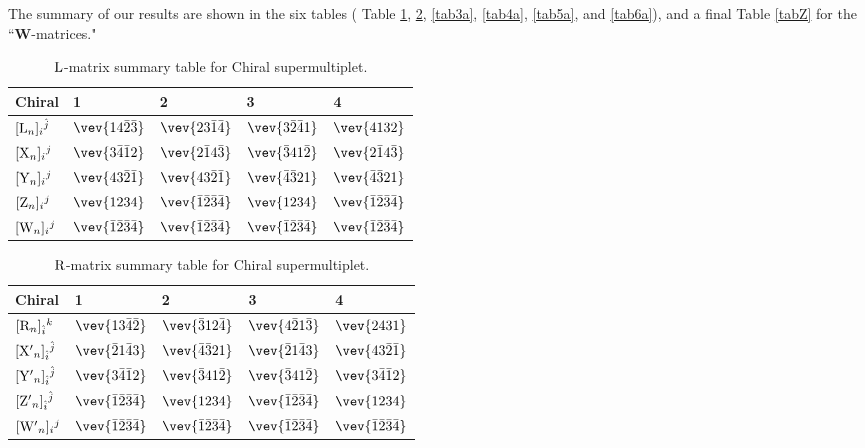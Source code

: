\documentclass[12pt]{article}
\def\rL{{\rm L}}
\def\rR{{\rm R}}
\let\bm\relax
\newcommand{\bm}[1]{{\boldsymbol{#1}}}
\begin{document}
The summary of our results are shown in the six tables ( Table \ref{tab1}, \ref{tab2}, \ref{tab3a}, \ref{tab4a}, \ref{tab5a}, and \ref{tab6a}), and a final Table \ref{tabZ} for the ``$\mathbf{W}$-matrices."

\begin{table}[H]
\setlength\extrarowheight{2pt}
\begin{center}
\begin{tabular}{|m{2.8em}|m{3.2cm}|m{3.2cm}|m{3.2cm}|m{3.2cm}|}
\hline
Chiral &  1&  2& 3& 4\\ 
\hline
$[{\bm \rL}_n]_{i}{}^{\hat j}$ & 
$\vev{14\bar2\bar3}$& 
$\vev{23\bar1\bar4}$& 
$\vev{3\bar2\bar41}$& 
$\vev{4132}$\\   
\hline
$[{\bm{\rm X}}_n]_{i}{}^{j}$ &  
$\vev{3\bar4\bar12}$&
$\vev{2\bar14\bar3}$&
$\vev{\bar341\bar2}$&
$\vev{2\bar14\bar3}$\\ 
\hline
$[{\bm{\rm Y}}_n]_{i}{}^{j}$ &  
$\vev{43\bar2\bar1}$&  
$\vev{43\bar2\bar1}$&   
$\vev{\bar4\bar321}$& 
$\vev{\bar4\bar321}$
\\ 
\hline
$[{\bm{\rm Z}}_n]_{i}{}^{j}$ &  
$\vev{1234}$&  
$\vev{\bar1\bar2\bar3\bar4}$&  
$\vev{1234}$&
$\vev{\bar1\bar2\bar3\bar4}$\\ 
\hline
$[{\bm{\rm W}}_n]_{i}{}^{j}$ &  
$\vev{\bar1\bar2\bar3\bar4}$&  
$\vev{\bar1\bar2\bar3\bar4}$&  
$\vev{\bar1\bar2\bar3\bar4}$&
$\vev{\bar1\bar2\bar3\bar4}$\\ 
\hline
\end{tabular}
\end{center}
\caption{$\bm\rL$-matrix summary table for Chiral supermultiplet.}
\label{tab1}
\end{table}

\begin{table}[H]\setlength\extrarowheight{2pt}
\begin{center}
\begin{tabular}{|m{2.8em}|m{3.2cm}|m{3.2cm}|m{3.2cm}|m{3.2cm}|}
\hline
Chiral &  1&  2& 3& 4\\ 
\hline
$[{\bm{\rm R}}_n]_{\hat i}{}^{k}$ & 
$\vev{13\bar4\bar2}$ 
&$\vev{\bar312\bar4}$
& $\vev{4\bar21\bar3}$
& $\vev{2431}$\\ 
\hline
$[{\bm{\rm X'}}_n]_{\hat i}{}^{\hat j}$ &  
$\vev{\bar21\bar43}$&
$\vev{\bar4\bar321}$&
$\vev{\bar21\bar43}$& 
$\vev{43\bar2\bar1}$\\ 
\hline
$[{\bm{\rm Y'}}_n]_{\hat i}{}^{\hat j}$ &  
$\vev{3\bar4\bar12}$& 
$\vev{\bar341\bar2}$&  
$\vev{\bar341\bar2}$&
$\vev{3\bar4\bar12}$
\\ 
\hline
$[{\bm{\rm Z'}}_n]_{\hat i}{}^{\hat j}$ &  
$\vev{\bar1\bar2\bar3\bar4}$&  
$\vev{1234}$&  
$\vev{\bar1\bar2\bar3\bar4}$&
$\vev{1234}$\\ 
\hline
$[{\bm{\rm W'}}_n]_{i}{}^{j}$ &  
$\vev{\bar1\bar2\bar3\bar4}$&  
$\vev{\bar1\bar2\bar3\bar4}$&  
$\vev{\bar1\bar2\bar3\bar4}$&
$\vev{\bar1\bar2\bar3\bar4}$\\ 
\hline
\end{tabular}
\end{center}
\caption{$\bm\rR$-matrix summary table for Chiral supermultiplet.}
\label{tab2}
\end{table}
\end{document}
